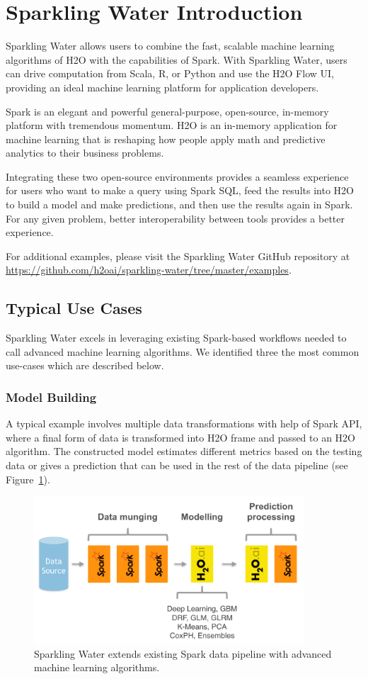 \documentclass{standalone}
\begin{document}
\section{Sparkling Water Introduction}

Sparkling Water allows users to combine the fast, scalable machine learning algorithms of H2O with the capabilities of Spark. With Sparkling Water, users can drive computation from Scala, R, or Python and use the H2O Flow UI, providing an ideal machine learning platform for application developers.

Spark is an elegant and powerful general-purpose, open-source, in-memory platform with tremendous momentum. H2O is an in-memory application for machine learning that is reshaping how people apply math and predictive analytics to their business problems.

Integrating these two open-source environments provides a seamless experience for users who want to make a query using Spark SQL, feed the results into H2O to build a model and make predictions, and then use the results again in Spark. For any given problem, better interoperability between tools provides a better experience. 

For additional examples, please visit the Sparkling Water GitHub repository at {\url{https://github.com/h2oai/sparkling-water/tree/master/examples}}. 

\subsection{Typical Use Cases}
Sparkling Water excels in leveraging existing Spark-based workflows needed to call advanced machine learning algorithms. We identified three the most common use-cases which are described below. 

\subsubsection{Model Building}
A typical example involves multiple data transformations with help of Spark API, where a final form of data is transformed into H2O frame and passed to an H2O algorithm. The constructed model estimates different metrics based on the testing data or gives a prediction that can be used in the rest of the data pipeline (see Figure~\ref{fig:uc1}).
\begin{figure}[h!]
	\centering
	\includegraphics[width=0.9\textwidth]{sw/images/uc1.png}
	\caption{Sparkling Water extends existing Spark data pipeline with advanced machine learning algorithms.}
	\label{fig:uc1} 
\end{figure}
\end{document}
